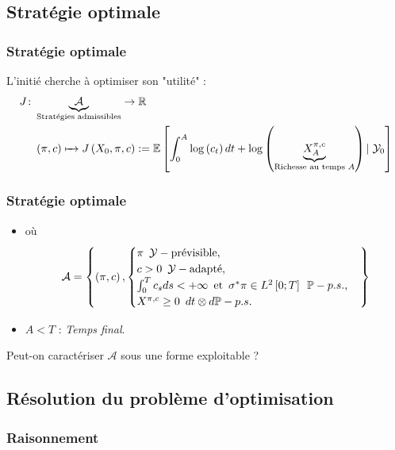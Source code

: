 \documentclass{beamer}
\begin{document}
\subsection{Stratégie optimale}
\begin{frame}
\frametitle{Stratégie optimale}
\par L'initié cherche à optimiser son "utilité" :
\small
\begin{align*}
      J \colon &\underbrace{\mathcal{A}}_{\text{Stratégies admissibles}} \to \mathbb{R} \\
       &\left( \pi, c \right) \xmapsto{\phantom{\mathcal{A}}} J \left( X_0, \pi, c \right) := \mathbb{E} \left[ \int_0^A \log  \left( c_t \right) dt + \log \left( \underbrace{X_A^{\pi, c}}_{\text{Richesse au temps } A} \right) \left\vert\right. \mathcal{Y}_0 \right]
\end{align*}

\end{frame}

\begin{frame}
\frametitle{Stratégie optimale}

\begin{itemize}

\item où
\begin{displaymath}
\mathcal{A} = \left\lbrace \left( \pi, c \right), 
\begin{cases} 
\pi \enskip \mathcal{Y}-\text{prévisible}, \\
c > 0 \enskip \mathcal{Y}-\text{adapté}, \\ 
\int_0^T c_s ds < + \infty \enskip \text{et} \enskip \sigma^* \pi \in L^2 \left[ 0; T \right] \enskip \mathbb{P}-p.s., \\
X^{\pi, c} \geq 0 \enskip dt \otimes d \mathbb{P}-p.s. 
\end{cases}
\right\rbrace
\end{displaymath} 
\item $A < T$ : \emph{Temps final}.
\end{itemize}
\par Peut-on caractériser $\mathcal{A}$ sous une forme exploitable ?
\end{frame}


\subsection{Résolution du problème d'optimisation}
\begin{frame}
\frametitle{Raisonnement}
\end{frame}
\end{document}
